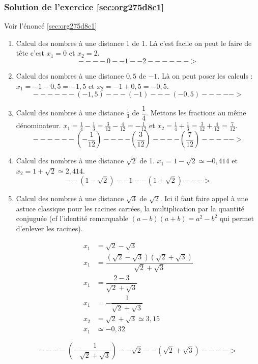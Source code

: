 \documentclass[a4paper, 11pt, twoside]{article}
\begin{document}
\subsubsection{Solution de l'exercice \ref{sec:org275d8c1}}
\label{sec:orga6de2e3}
Voir l'énoncé \ref{sec:org275d8c1}

\begin{enumerate}
\item Calcul des nombres à une distance 1 de 1. Là c'est facile on
peut le faire de tête c'est \(x_1 = 0\) et \(x_2 = 2\).
\[----0--1--2------>\]
\item Calcul des nombres à une distance \(0,5\) de \(-1\). Là on peut
poser les calculs : \(x_1 = -1 - 0,5 = -1,5\) et \(x_2 = -1 + 0,5 =
       -0,5\).
\[------(-1,5)---(-1)---(-0,5)----->\]
\item Calcul des nombres à une distance \(\frac{1}{3}\) de
\(\dfrac{1}{4}\). Mettons les fractions au même
dénominateur. \(x_1 = \frac{1}{4} - \frac{1}{3} = \frac{3}{12} -
       \frac{4}{12} = -\frac{1}{12}\) et \(x_2 = \frac{1}{4} +
       \frac{1}{3} = \frac{3}{12} + \frac{4}{12} = \frac{7}{12}\).
\[------\left(-\frac{1}{12}\right)----\left(\frac{3}{12}\right)----\left(\frac{7}{12}\right)----->\]

\item Calcul des nombres à une distance \(\sqrt{2}\) de 1. \(x_1 = 1 -
       \sqrt{2}\simeq -0,414\) et \(x_2 = 1 + \sqrt{2} \simeq 2,414\).
\[--(1-\sqrt{2})--1--(1+\sqrt{2})--->\]

\item Calcul des nombres à une distance \(\sqrt{3}\) de \(\sqrt{2}\). Ici
il faut faire appel à une astuce classique pour les racines
carrées, la multiplication par la quantité conjuguée (cf
l'identité remarquable \((a - b)(a + b) = a^2 - b^2\) qui permet
d'enlever les racines).

\begin{align*}
x_1 &= \sqrt{2} - \sqrt{3} \\
x_1 &= \dfrac{(\sqrt{2} - \sqrt{3})(\sqrt{2} + \sqrt{3})}{\sqrt{2} + \sqrt{3}} \\
x_1 &= \dfrac{2 - 3}{\sqrt{2} + \sqrt{3}} \\
x_1 &= -\dfrac{1}{\sqrt{2} + \sqrt{3}} \\
x_2 &= \sqrt{2} + \sqrt{3}\simeq 3,15 \\
x_1 &\simeq -0,32
\end{align*}

\[----\left(-\dfrac{1}{\sqrt{2} + \sqrt{3}}\right)--\sqrt{2}--(\sqrt{2} + \sqrt{3})---->\]


\end{enumerate}
\end{document}
